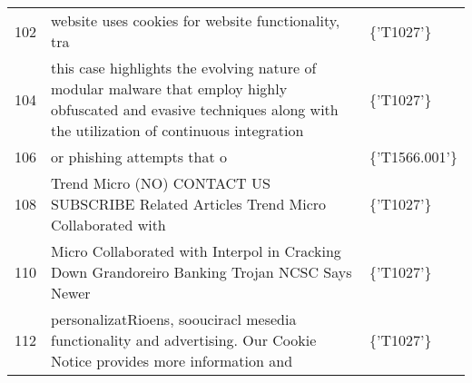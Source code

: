 \begin{tabular}{rll}
102 & website uses cookies for website functionality, tra & \{'T1027'\} \\
104 & this case highlights the evolving nature of modular malware that employ highly obfuscated and evasive techniques along with the utilization of continuous integration & \{'T1027'\} \\
106 & or phishing attempts that o & \{'T1566.001'\} \\
108 &   Trend Micro (NO) CONTACT US SUBSCRIBE Related Articles Trend Micro Collaborated with & \{'T1027'\} \\
110 & Micro Collaborated with Interpol in Cracking Down Grandoreiro Banking Trojan NCSC Says Newer & \{'T1027'\} \\
112 & personalizatRioens, soouciracl mesedia functionality and advertising. Our Cookie Notice provides more information and & \{'T1027'\} \\
\bottomrule
\end{tabular}
